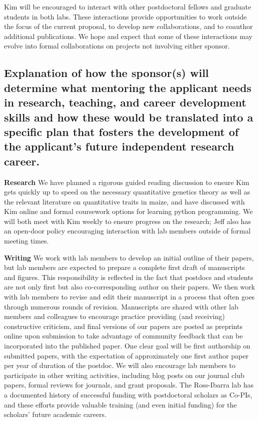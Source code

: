 Kim will be encouraged to interact with other postdoctoral fellows and graduate students in both labs.  These interactions provide opportunities to work outside the focus of the current proposal, to develop new collaborations, and to coauthor additional publications.  We hope and expect that some of these interactions may evolve into formal collaborations on projects not involving either sponsor.  

\subsection{Explanation of how the sponsor(s) will determine what mentoring the applicant needs in research, teaching, and career development skills and how these would be translated into a specific plan that fosters the development of the applicant's future independent research career.}

\textbf{Research} We have planned a rigorous guided reading discussion to ensure Kim gets quickly up to speed on the necessary quantitative genetics theory as well as the relevant literature on quantitative traits in maize, and have discussed with Kim online and formal coursework options for learning python programming. We will both meet with Kim weekly to ensure progress on the research; Jeff also has an open-door policy encouraging interaction with lab members outside of formal meeting times.

\textbf{Writing} We work with lab members to develop an initial outline of their papers, but lab members are expected to prepare a complete first draft of manuscripts and figures. This responsibility is reflected in the fact that postdocs and students are not only first but also co-corresponding author on their papers. We then work with lab members to revise and edit their manuscript in a process that often goes through numerous rounds of revision. Manuscripts are shared with other lab members and colleagues to encourage practice providing (and receiving) constructive criticism, and final versions of our papers are posted as preprints online upon submission to take advantage of community feedback that can be incorporated into the published paper. One clear goal will be first authorship on submitted papers, with the expectation of approximately one first author paper per year of duration of the postdoc. We will also encourage lab members to participate in other writing activities, including blog posts on our journal club papers, formal reviews for journals, and grant proposals. The Ross-Ibarra lab has a documented history of successful funding with postdoctoral scholars as Co-PIs, and these efforts provide valuable training (and even initial funding) for the scholars' future academic careers. 

